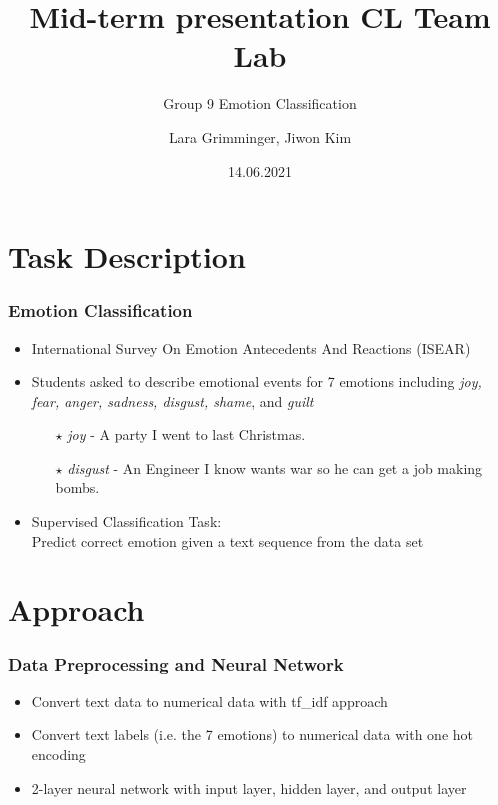 \documentclass[aspectratio=169]{beamer}
\title[Mid-term presentation CL Team Lab]
{Mid-term presentation CL Team Lab}
\subtitle{Group 9 Emotion Classification}
\author{Lara Grimminger, Jiwon Kim}
\date{14.06.2021}
\begin{document}
\begin{frame}
\maketitle
\end{frame}

\section{Task Description}


\begin{frame}
\frametitle{Emotion Classification}

\begin{itemize}
\setlength\itemsep{1em}
\item International Survey On Emotion Antecedents And Reactions (ISEAR)
\item Students asked to describe emotional events for 7 emotions including \emph{joy, fear, anger, sadness, disgust, shame}, and \emph{guilt}
\hspace{+5mm}
\begin{itemize}
\setlength\itemsep{0.3em}
\item [$\star$]\emph{joy} - A party I went to last Christmas.
\item [$\star$]\emph{disgust} - An Engineer I know wants war so he can get a job making bombs.

\end{itemize}

\item Supervised Classification Task:\\ Predict correct emotion given a text sequence from the data set

\end{itemize}

\end{frame}


\section{Approach}

\begin{frame}
\frametitle{Data Preprocessing and Neural Network}
\begin{itemize}


\item Convert text data to numerical data with tf\_idf approach
\item Convert text labels (i.e. the 7 emotions) to numerical data with one hot encoding
\item 2-layer neural network with input layer, hidden layer, and output layer
\end{itemize}
\end{frame}
\end{document}
